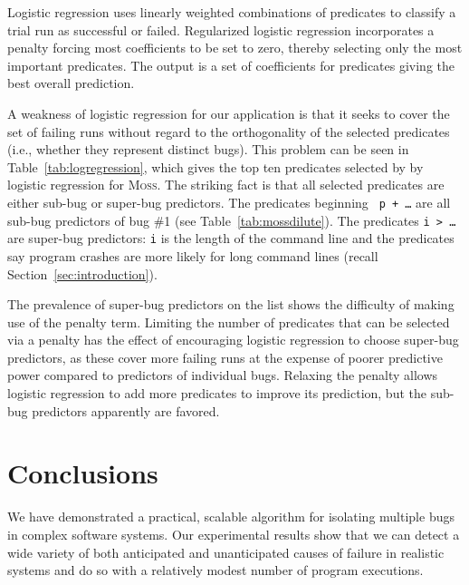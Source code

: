 \documentclass[draft]{sig-alternate}
\newcommand{\moss}{\textsc{Moss}\xspace}
\begin{document}
Logistic regression uses linearly weighted
combinations of predicates to classify a trial run as successful or
failed.  Regularized logistic regression incorporates a penalty
forcing most coefficients to be set to zero, thereby
selecting only the most important predicates.  The output is a set of
coefficients for predicates giving the best overall prediction.

A weakness of logistic regression for our application is that it seeks
to cover the set of failing runs without regard to the orthogonality
of the selected predicates (i.e., whether they represent distinct
bugs).  This problem can be seen in Table~\ref{tab:logregression},
which gives the top ten predicates selected by by logistic regression
for \moss.  The striking fact is that all selected predicates are
either sub-bug or super-bug predictors.  The predicates beginning {\tt
p + \ldots} are all sub-bug predictors of bug \#1 (see
Table~\ref{tab:mossdilute}).  The predicates {\tt i > \ldots} are
super-bug predictors: {\tt i} is the length of the command line and
the predicates say program crashes are more likely for long command
lines (recall Section~\ref{sec:introduction}).

The prevalence of super-bug predictors on the list shows the
difficulty of making use of the penalty term.  Limiting the number of
predicates that can be selected via a penalty has the effect of
encouraging logistic regression to choose super-bug predictors, as
these cover more failing runs at the expense of poorer predictive
power compared to predictors of individual bugs.  Relaxing the penalty
allows logistic regression to add more predicates to improve its
prediction, but the sub-bug predictors apparently are favored.

\section{Conclusions}
\label{sec:conclusions}

We have demonstrated a practical, scalable algorithm for isolating multiple bugs
in complex software systems.  Our experimental results show that we can
detect a wide variety of both anticipated and unanticipated causes of failure
in realistic systems and do so with a relatively modest number of program
executions.

{\small

}
\end{document}
